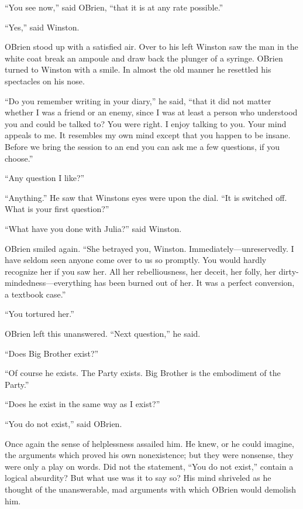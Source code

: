 ``You see now,'' said O\textquotesingle Brien, ``that it is at any rate
possible.''

``Yes,'' said Winston.

O\textquotesingle Brien stood up with a satisfied air. Over to his left
Winston saw the man in the white coat break an ampoule and draw back the
plunger of a syringe. O\textquotesingle Brien turned to Winston with a
smile. In almost the old manner he resettled his spectacles on his nose.

``Do you remember writing in your diary,'' he said, ``that it did not
matter whether I was a friend or an enemy, since I was at least a person
who understood you and could be talked to? You were right. I enjoy
talking to you. Your mind appeals to me. It resembles my own mind except
that you happen to be insane. Before we bring the session to an end you
can ask me a few questions, if you choose.''

``Any question I like?''

``Anything.'' He saw that Winston\textquotesingle s eyes were upon the
dial. ``It is switched off. What is your first question?''

``What have you done with Julia?'' said Winston.

O\textquotesingle Brien smiled again. ``She betrayed you, Winston.
Immediately---unreservedly. I have seldom seen anyone come over to us so
promptly. You would hardly recognize her if you saw her. All her
rebelliousness, her deceit, her folly, her dirty-mindedness---everything
has been burned out of her. It was a perfect conversion, a textbook
case.''

``You tortured her.''

O\textquotesingle Brien left this unanswered. ``Next question,'' he said.

``Does Big Brother exist?''

``Of course he exists. The Party exists. Big Brother is the embodiment of
the Party.''

``Does he exist in the same way as I exist?''

``You do not exist,'' said O\textquotesingle Brien.

Once again the sense of helplessness assailed him. He knew, or he could
imagine, the arguments which proved his own nonexistence; but they were
nonsense, they were only a play on words. Did not the statement, ``You do
not exist,'' contain a logical absurdity? But what use was it to say so?
His mind shriveled as he thought of the unanswerable, mad arguments with
which O\textquotesingle Brien would demolish him.

